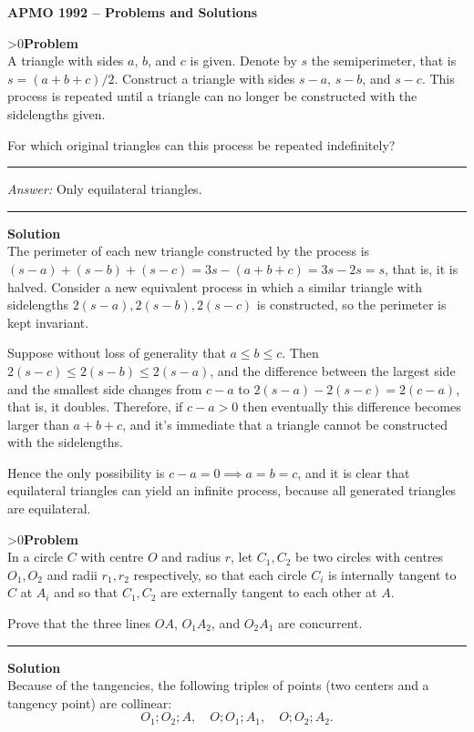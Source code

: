 \documentclass[12pt,oneside,a4paper]{book}
\newcounter{probnum}
\newcounter{solnum}
\newcommand{\prob}{\ifnum\value{probnum}>0\newpage\fi\setcounter{solnum}{0}\stepcounter{probnum}\textbf{Problem \theprobnum}\\}
\newcommand{\ans}{\medskip\hrule\medbreak\emph{Answer: }}
\newcommand{\sol}{\medskip\hrule\medbreak\textbf{Solution}\\}
\begin{document}
\begin{center}
\textbf{\large APMO 1992 -- Problems and Solutions}
\end{center}

\prob A triangle with sides $a$, $b$, and $c$ is given. Denote by $s$ the semiperimeter, that is $s= (a+b+c)/2$. Construct a triangle with sides $s-a$, $s-b$, and $s-c$. This process is repeated until a triangle can no longer be constructed with the sidelengths given.

For which original triangles can this process be repeated indefinitely?

\ans Only equilateral triangles.

\sol
The perimeter of each new triangle constructed by the process is $(s-a)+(s-b)+(s-c) = 3s-(a+b+c) = 3s-2s=s$, that is, it is halved. Consider a new equivalent process in which a similar triangle with sidelengths $2(s-a),2(s-b),2(s-c)$ is constructed, so the perimeter is kept invariant.

Suppose without loss of generality that $a\le b\le c$. Then $2(s-c) \le 2(s-b) \le 2(s-a)$, and the difference between the largest side and the smallest side changes from $c-a$ to $2(s-a) - 2(s-c) = 2(c-a)$, that is, it doubles. Therefore, if $c-a>0$ then eventually this difference becomes larger than $a+b+c$, and it's immediate that a triangle cannot be constructed with the sidelengths.

Hence the only possibility is $c-a=0\implies a=b=c$, and it is clear that equilateral triangles can yield an infinite process, because all generated triangles are equilateral. 

\prob In a circle $C$ with centre $O$ and radius $r$, let $C_1,C_2$ be two circles with centres $O_1,O_2$ and radii $r_1,r_2$ respectively, so that each circle $C_i$ is internally tangent to $C$ at $A_i$ and so that $C_1,C_2$ are externally tangent to each other at $A$.

Prove that the three lines $OA$, $O_1A_2$, and $O_2A_1$ are concurrent.

\sol
Because of the tangencies, the following triples of points (two centers and a tangency point) are collinear:
\[O_1;O_2;A,\quad O;O_1;A_1, \quad O;O_2;A_2.\]
\end{document}
